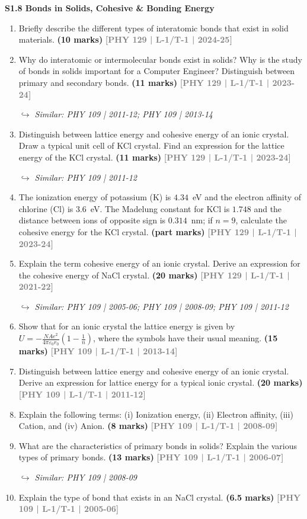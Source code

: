 \documentclass[12pt,a3paper]{article}
\newcommand{\yr}[1]{\hfill\textcolor{gray}{\small\textbf{[#1]}}}
\newcommand{\mk}[1]{\textcolor{orange!70!black}{\small\textbf{(#1 marks)}}}
\newcommand{\variant}[1]{\par\vspace{1pt}\textcolor{blue!50!black}%
  {\footnotesize\textit{$\hookrightarrow$ Similar: #1}}}
\newcommand{\subtopic}[2]{%
  \vspace{10pt}
  \noindent\begin{tcolorbox}[colback=#1!8,colframe=#1,boxrule=0.6pt,arc=4pt,
    left=6pt,right=6pt,top=4pt,bottom=4pt]
    \small\bfseries\textcolor{#1}{#2}
  \end{tcolorbox}
  \vspace{2pt}
}
\begin{document}
\label{sec:s18}
\subtopic{cA}{S1.8 \quad Bonds in Solids, Cohesive \& Bonding Energy}

\begin{enumerate}

\item Briefly describe the different types of interatomic bonds that exist in solid
materials.   \mk{10} \yr{PHY 129 | L-1/T-1 | 2024-25}


\item Why do interatomic or intermolecular bonds exist in solids? Why is the study of bonds in solids important for a Computer Engineer? Distinguish between primary and secondary bonds.
\mk{11} \yr{PHY 129 | L-1/T-1 | 2023-24}
\variant{PHY 109 | 2011-12; PHY 109 | 2013-14}

\item Distinguish between lattice energy and cohesive energy of an ionic crystal. Draw a typical unit cell of KCl crystal. Find an expression for the lattice energy of the KCl crystal.
\mk{11} \yr{PHY 129 | L-1/T-1 | 2023-24}
\variant{PHY 109 | 2011-12}

\item The ionization energy of potassium (K) is $4.34$~eV and the electron affinity of chlorine (Cl) is $3.6$~eV. The Madelung constant for KCl is $1.748$ and the distance between ions of opposite sign is $0.314$~nm; if $n = 9$, calculate the cohesive energy for the KCl crystal.
\mk{part} \yr{PHY 129 | L-1/T-1 | 2023-24}

\item Explain the term cohesive energy of an ionic crystal. Derive an expression for the cohesive energy of NaCl crystal.
\mk{20} \yr{PHY 129 | L-1/T-1 | 2021-22}
\variant{PHY 109 | 2005-06; PHY 109 | 2008-09; PHY 109 | 2011-12}

\item Show that for an ionic crystal the lattice energy is given by $U = -\frac{N A e^2}{4\pi\varepsilon_0 r_0}\left(1 - \frac{1}{n}\right)$, where the symbols have their usual meaning.
\mk{15} \yr{PHY 109 | L-1/T-1 | 2013-14}

\item Distinguish between lattice energy and cohesive energy of an ionic crystal. Derive an expression for lattice energy for a typical ionic crystal.
\mk{20} \yr{PHY 109 | L-1/T-1 | 2011-12}

\item Explain the following terms: (i) Ionization energy, (ii) Electron affinity, (iii) Cation, and (iv) Anion.
\mk{8} \yr{PHY 109 | L-1/T-1 | 2008-09}

\item What are the characteristics of primary bonds in solids? Explain the various types of primary bonds.
\mk{13} \yr{PHY 109 | L-1/T-1 | 2006-07}
\variant{PHY 109 | 2008-09}

\item Explain the type of bond that exists in an NaCl crystal.
\mk{6.5} \yr{PHY 109 | L-1/T-1 | 2005-06}

\end{enumerate}
\end{document}
